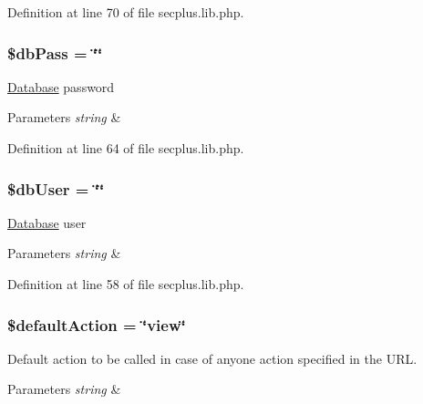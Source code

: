 Definition at line 70 of file secplus.lib.php.

\hypertarget{class_sec_plus_1_1_config_a30d808caf55f524798c6a5aaafd633ad}{
\subsubsection[{\$dbPass}]{\setlength{\rightskip}{0pt plus 5cm}\$dbPass = \char`\"{}\char`\"{}}}
\label{class_sec_plus_1_1_config_a30d808caf55f524798c6a5aaafd633ad}
\hyperlink{class_sec_plus_1_1_database}{Database} password 
\begin{DoxyParams}{Parameters}
{\em string} & \\
\hline
\end{DoxyParams}


Definition at line 64 of file secplus.lib.php.

\hypertarget{class_sec_plus_1_1_config_a4a92606de85aafdc0dcae4976b7ca669}{
\subsubsection[{\$dbUser}]{\setlength{\rightskip}{0pt plus 5cm}\$dbUser = \char`\"{}\char`\"{}}}
\label{class_sec_plus_1_1_config_a4a92606de85aafdc0dcae4976b7ca669}
\hyperlink{class_sec_plus_1_1_database}{Database} user 
\begin{DoxyParams}{Parameters}
{\em string} & \\
\hline
\end{DoxyParams}


Definition at line 58 of file secplus.lib.php.

\hypertarget{class_sec_plus_1_1_config_ab8b5213f191f4e05bec89f1841a35c16}{
\subsubsection[{\$defaultAction}]{\setlength{\rightskip}{0pt plus 5cm}\$defaultAction = \char`\"{}view\char`\"{}}}
\label{class_sec_plus_1_1_config_ab8b5213f191f4e05bec89f1841a35c16}
Default action to be called in case of anyone action specified in the URL. 
\begin{DoxyParams}{Parameters}
{\em string} & \\
\hline
\end{DoxyParams}


